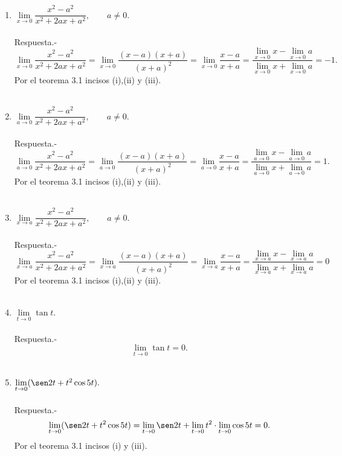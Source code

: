 \begin{enumerate}[\bfseries 1.]
    \item $\lim\limits_{x\to 0}\dfrac{x^2-a^2}{x^2+2ax+a^2},\qquad a\neq 0$.\\\\
	Respuesta.-\; 
	$$\lim\limits_{x\to 0}\dfrac{x^2-a^2}{x^2+2ax+a^2} = \lim_{x\to 0}\dfrac{(x-a)(x+a)}{(x+a)^2}=\lim_{x\to 0}\dfrac{x-a}{x+a}=\dfrac{\lim\limits_{x\to 0}x-\lim\limits_{x\to 0}a}{\lim\limits_{x\to 0}x + \lim\limits_{x\to 0}a} = -1.$$
	Por el teorema 3.1 incisos (i),(ii) y (iii).\\\\

    \item $\lim\limits_{a\to 0}\dfrac{x^2-a^2}{x^2+2ax+a^2},\qquad a\neq 0.$\\\\
	Respuesta.-\; 
	$$\lim\limits_{a\to 0}\dfrac{x^2-a^2}{x^2+2ax+a^2} = \lim_{a\to 0}\dfrac{(x-a)(x+a)}{(x+a)^2}=\lim_{a\to 0}\dfrac{x-a}{x+a}=\dfrac{\lim\limits_{a\to 0}x-\lim\limits_{a\to 0}a}{\lim\limits_{a\to 0}x + \lim\limits_{a\to 0}a} = 1.$$
	Por el teorema 3.1 incisos (i),(ii) y (iii).\\\\

    \item $\lim\limits_{x\to a}\dfrac{x^2-a^2}{x^2+2ax+a^2},\qquad a\neq 0.$\\\\
	Respuesta.-\; 
	$$\lim\limits_{x\to a}\dfrac{x^2-a^2}{x^2+2ax+a^2} = \lim_{x\to a}\dfrac{(x-a)(x+a)}{(x+a)^2}=\lim_{x\to a}\dfrac{x-a}{x+a}=\dfrac{\lim\limits_{x\to a}x-\lim\limits_{x\to a}a}{\lim\limits_{x\to a}x + \lim\limits_{x\to a}a} = 0$$
	Por el teorema 3.1 incisos (i),(ii) y (iii).\\\\

    \item $\lim\limits_{t\to 0} \tan t.$\\\\
	Respuesta.-\; 
	$$\lim\limits_{t\to 0} \tan t = 0.$$\\

    \item $\lim\limits_{t\to 0}(\sen 2t + t^2 \cos 5t).$\\\\
	Respuesta.-\; 
	$$\lim\limits_{t\to 0}(\sen 2t + t^2 \cos 5t) = \lim_{t\to 0}\sen 2t + \lim_{t\to 0}t^2\cdot \lim_{t\to 0}\cos 5t = 0.$$
	Por el teorema 3.1 incisos (i) y (iii).\\\\


\end{enumerate}
